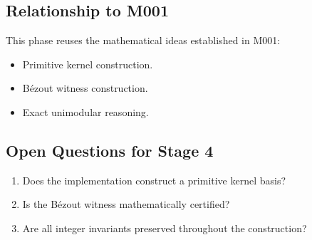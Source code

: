 \subsection{Relationship to M001}

This phase reuses the mathematical ideas established in M001:

\begin{itemize}
\item Primitive kernel construction.
\item Bézout witness construction.
\item Exact unimodular reasoning.
\end{itemize}

\subsection{Open Questions for Stage 4}

\begin{enumerate}
\item Does the implementation construct a primitive kernel basis?
\item Is the Bézout witness mathematically certified?
\item Are all integer invariants preserved throughout the construction?
\end{enumerate}
